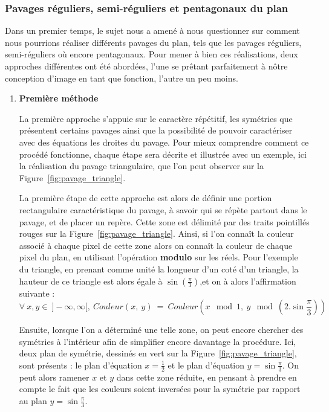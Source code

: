 \documentclass{article}
\begin{document}
\subsubsection{Pavages réguliers, semi-réguliers et pentagonaux du plan}
Dans un premier temps, le sujet nous a amené à nous questionner sur comment nous pourrions réaliser différents pavages du plan, tels que les pavages réguliers, semi-réguliers où encore pentagonaux. Pour mener à bien ces réalisations, deux approches différentes ont été abordées, l'une se prêtant parfaitement à nôtre conception d'image en tant que fonction, l'autre un peu moins.
\begin{enumerate}
    \item \textbf{Première méthode} 
    
\hspace*{0.5cm}La première approche s'appuie sur le caractère répétitif, les symétries que présentent certains pavages ainsi que la possibilité de pouvoir caractériser avec des équations les droites du pavage. Pour mieux comprendre comment ce procédé fonctionne, chaque étape sera décrite et illustrée avec un exemple, ici la réalisation du pavage triangulaire, que l'on peut observer sur la Figure~\ref{fig:pavage_triangle}.

\hspace*{0.5cm}\hspace*{0.5cm}La première étape de cette approche est alors de définir une portion rectangulaire caractéristique du pavage, à savoir qui se répète partout dans le pavage, et de placer un repère. Cette zone est délimité par des traits pointillés rouges sur la Figure~\ref{fig:pavage_triangle}. Ainsi, si l'on connaît la couleur associé à chaque pixel de cette zone alors on connaît la couleur de chaque pixel du plan, en utilisant l'opération \textbf{modulo} sur les réels. Pour l'exemple du triangle, en prenant comme unité la longueur d'un coté d'un triangle, la hauteur de ce triangle est alors égale à $\sin \left(\frac{\pi}{3}\right)$,et on à alors l'affirmation suivante : 
\begin{equation*}
    \forall \: x, y \in\ ]-\infty, \infty[,\ Couleur(x,\ y)\ =\ Couleur \left(x \mod 1,\ y \mod \left(2.\sin\frac{\pi}{3} \right)\right)
\end{equation*}

\hspace*{0.5cm}Ensuite, lorsque l'on a déterminé une telle zone, on peut encore chercher des symétries à l'intérieur afin de simplifier encore davantage la procédure. Ici, deux plan de symétrie, dessinés en vert sur la Figure~\ref{fig:pavage_triangle}, sont présents : le plan d'équation $x = \frac{1}{2}$ et le plan d'équation $y = \sin\frac{\pi}{3}$. On peut alors ramener $x$ et $y$ dans cette zone réduite, en pensant à prendre en compte le fait que les couleurs soient inversées pour la symétrie par rapport au plan $y = \sin\frac{\pi}{3}$. 


\end{enumerate}
\end{document}
